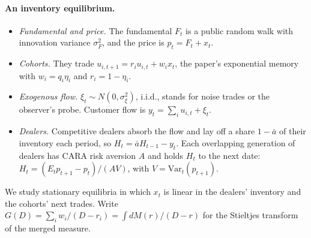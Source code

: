 \documentclass[12pt]{article}
\theoremstyle{definition}
\theoremstyle{remark}
\begin{document}
\paragraph{An inventory equilibrium.}
\begin{itemize}[itemsep=1pt,topsep=2pt]
\item \emph{Fundamental and price.} The fundamental $F_t$ is a public random walk with innovation variance $\sigma_F^2$, and the price is $p_t=F_t+x_t$.
\item \emph{Cohorts.} They trade $u_{i,t+1}=r_iu_{i,t}+w_ix_t$, the paper's exponential memory with $w_i=q_i\eta_i$ and $r_i=1-\eta_i$.
\item \emph{Exogenous flow.} $\xi_t\sim N(0,\sigma_\xi^2)$, i.i.d., stands for noise trades or the observer's probe. Customer flow is $y_t=\sum_iu_{i,t}+\xi_t$.
\item \emph{Dealers.} Competitive dealers absorb the flow and lay off a share $1-\bar a$ of their inventory each period, so $H_t=\bar aH_{t-1}-y_t$. Each overlapping generation of dealers has CARA risk aversion $A$ and holds $H_t$ to the next date: $H_t=(E_tp_{t+1}-p_t)/(AV)$, with $V=\mathrm{Var}_t(p_{t+1})$.
\end{itemize}
We study stationary equilibria in which $x_t$ is linear in the dealers' inventory and the cohorts' next trades. Write $G(D)=\sum_iw_i/(D-r_i)=\int dM(r)/(D-r)$ for the Stieltjes transform of the merged measure.
\end{document}
